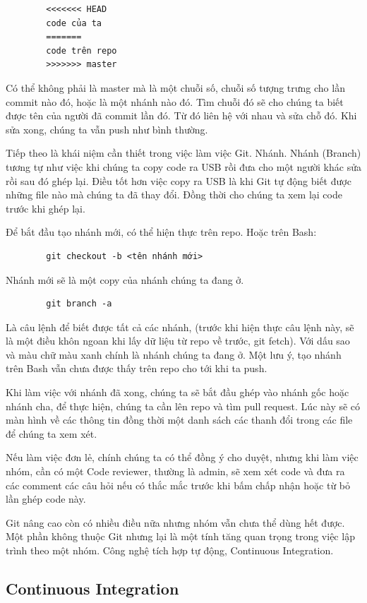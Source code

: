 \documentclass[12pt,a4paper]{report}
\begin{document}
		\begin{verbatim}
		<<<<<<< HEAD
		code của ta
		=======
		code trên repo
		>>>>>>> master
		\end{verbatim}
		Có thể không phải là master mà là một chuỗi số, chuỗi số tượng trưng cho lần commit nào đó, hoặc là một nhánh nào đó. Tìm chuỗi đó sẽ cho chúng ta biết được tên của người đã commit lần đó. Từ đó liên hệ với nhau và sửa chỗ đó. Khi sửa xong, chúng ta vẫn push như bình thường.\par

		Tiếp theo là khái niệm cần thiết trong việc làm việc Git. Nhánh. Nhánh (Branch) tương tự như việc khi chúng ta copy code ra USB rồi đưa cho một người khác sửa rồi sau đó ghép lại. Điều tốt hơn việc copy ra USB là khi Git tự động biết được những file nào mà chúng ta đã thay đổi. Đồng thời cho chúng ta xem lại code trước khi ghép lại.\par
		Để bắt đầu tạo nhánh mới, có thể hiện thực trên repo. Hoặc trên Bash:
		\begin{verbatim}
		git checkout -b <tên nhánh mới>
		\end{verbatim}
		Nhánh mới sẽ là một copy của nhánh chúng ta đang ở.
		\begin{verbatim}
		git branch -a
		\end{verbatim}
		Là câu lệnh để biết được tất cả các nhánh, (trước khi hiện thực câu lệnh này, sẽ là một điều khôn ngoan khi lấy dữ liệu từ repo về trước, git fetch). Với dấu sao và màu chữ màu xanh chính là nhánh chúng ta đang ở. Một lưu ý, tạo nhánh trên Bash vẫn chưa được thấy trên repo cho tới khi ta push.\par
		Khi làm việc với nhánh đã xong, chúng ta sẽ bắt đầu ghép vào nhánh gốc hoặc nhánh cha, để thực hiện, chúng ta cần lên repo và tìm pull request. Lúc này sẽ có màn hình về các thông tin đồng thời một danh sách các thanh đổi trong các file để chúng ta xem xét.\par
		Nếu làm việc đơn lẻ, chính chúng ta có thể đồng ý cho duyệt, nhưng khi làm việc nhóm, cần có một Code reviewer, thường là admin, sẽ xem xét code và đưa ra các comment các câu hỏi nếu có thắc mắc trước khi bấm chấp nhận hoặc từ bỏ lần ghép code này.\par
		Git nâng cao còn có nhiều điều nữa nhưng nhóm vẫn chưa thể dùng hết được. Một phần không thuộc Git nhưng lại là một tính tăng quan trọng trong việc lập trình theo một nhóm. Công nghệ tích hợp tự động, Continuous Integration.

		\subsection{Continuous Integration}
\end{document}
